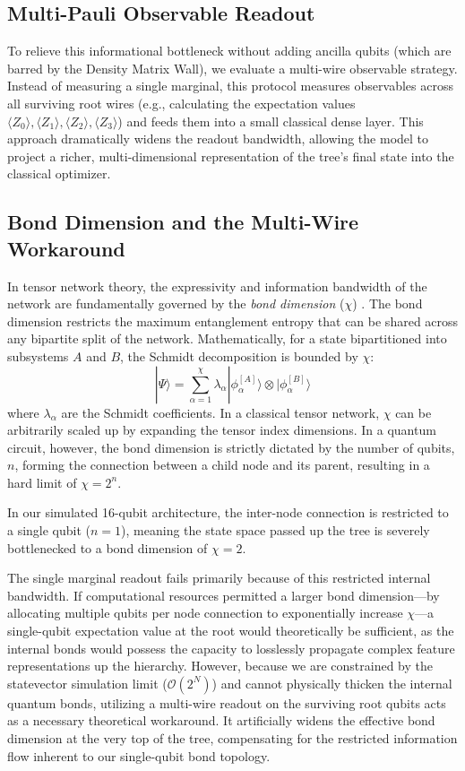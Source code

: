 \documentclass[12pt, a4paper, oneside]{report}
\begin{document}
\subsection{Multi-Pauli Observable Readout}
To relieve this informational bottleneck without adding ancilla qubits (which are barred by the Density Matrix Wall), we evaluate a multi-wire observable strategy. Instead of measuring a single marginal, this protocol measures observables across all surviving root wires (e.g., calculating the expectation values $\langle Z_0 \rangle, \langle Z_1 \rangle, \langle Z_2 \rangle, \langle Z_3 \rangle$) and feeds them into a small classical dense layer. This approach dramatically widens the readout bandwidth, allowing the model to project a richer, multi-dimensional representation of the tree's final state into the classical optimizer.

\subsection{Bond Dimension and the Multi-Wire Workaround}
In tensor network theory, the expressivity and information bandwidth of the network are fundamentally governed by the \textit{bond dimension} ($\chi$) \cite{schollwock2011}. The bond dimension restricts the maximum entanglement entropy that can be shared across any bipartite split of the network. Mathematically, for a state bipartitioned into subsystems $A$ and $B$, the Schmidt decomposition is bounded by $\chi$:
\begin{equation}
    |\Psi\rangle = \sum_{\alpha=1}^{\chi} \lambda_\alpha |\phi_\alpha^{[A]}\rangle \otimes |\phi_\alpha^{[B]}\rangle
\end{equation}
where $\lambda_\alpha$ are the Schmidt coefficients. In a classical tensor network, $\chi$ can be arbitrarily scaled up by expanding the tensor index dimensions. In a quantum circuit, however, the bond dimension is strictly dictated by the number of qubits, $n$, forming the connection between a child node and its parent, resulting in a hard limit of $\chi = 2^n$. 

In our simulated 16-qubit architecture, the inter-node connection is restricted to a single qubit ($n=1$), meaning the state space passed up the tree is severely bottlenecked to a bond dimension of $\chi = 2$. 

The single marginal readout fails primarily because of this restricted internal bandwidth. If computational resources permitted a larger bond dimension—by allocating multiple qubits per node connection to exponentially increase $\chi$—a single-qubit expectation value at the root would theoretically be sufficient, as the internal bonds would possess the capacity to losslessly propagate complex feature representations up the hierarchy. However, because we are constrained by the statevector simulation limit ($\mathcal{O}(2^N)$) and cannot physically thicken the internal quantum bonds, utilizing a multi-wire readout on the surviving root qubits acts as a necessary theoretical workaround. It artificially widens the effective bond dimension at the very top of the tree, compensating for the restricted information flow inherent to our single-qubit bond topology.
\end{document}
